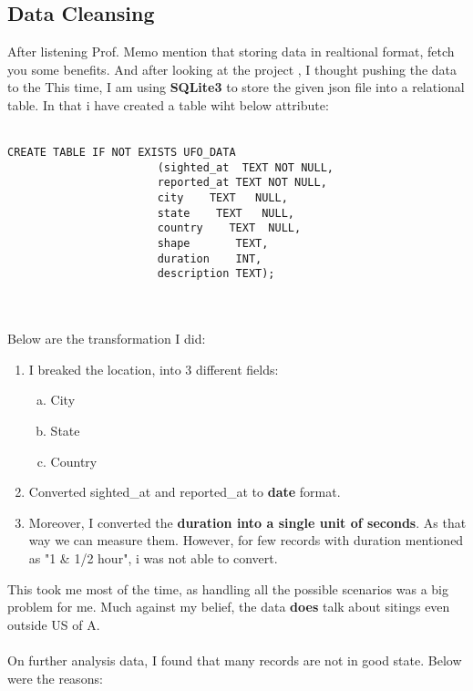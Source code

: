\documentclass{article}
\begin{document}
\subsection*{Data Cleansing}
After listening Prof. Memo mention that storing data in realtional format, fetch you some benefits. And after looking at the project , I thought pushing the data to the This time, I am using \textbf{SQLite3} to store the given json file into a relational table. In that i have created a table wiht below attribute:\\ \\
\begin{BVerbatim}
CREATE TABLE IF NOT EXISTS UFO_DATA
	                   (sighted_at  TEXT NOT NULL,
	                   reported_at TEXT NOT NULL,
	                   city    TEXT   NULL,
	                   state    TEXT   NULL,
	                   country    TEXT  NULL,
	                   shape       TEXT,
	                   duration    INT,
	                   description TEXT); 
\end{BVerbatim}
\\ \\ Below are the transformation I did:
\begin{enumerate}
	\item I breaked the location, into 3 different fields:
		\begin{enumerate}[a.]
			\item City
			\item State
			\item Country
		\end{enumerate}
	\item Converted  sighted\_at and reported\_at to \textbf{date} format.
	\item Moreover, I converted the \textbf{duration into a single unit of seconds}. As that way we can measure them. However, for few records with duration mentioned as "1 \& 1/2 hour", i was not able to convert. 

\end{enumerate}
This took me most of the time, as handling all the possible scenarios was a big problem for me. Much against my belief, the data \textbf{does} talk about sitings even outside US of A. \\ \\
On further analysis data, I found that many records are not in good state. Below were the reasons:
\end{document}

